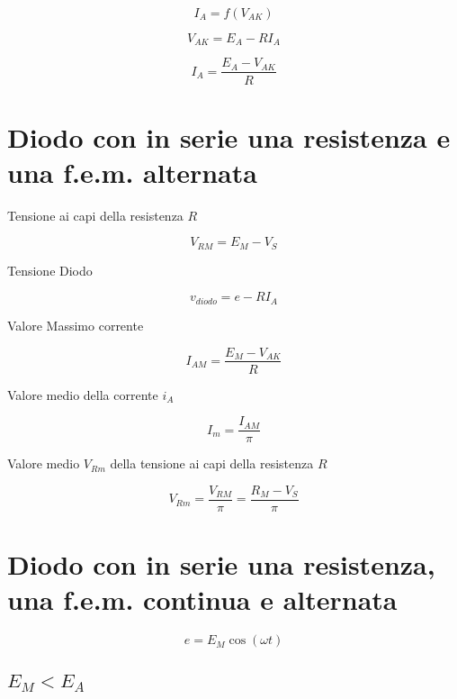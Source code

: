 \begin{equation}
  I_{A} = f(V_{AK})
\end{equation}

\begin{equation}
  V_{AK} = E_{A} - R I_{A}
\end{equation}

\begin{equation}
  I_{A} = \frac{E_{A} - V_{AK}}{R}
\end{equation}

\section{Diodo con in serie una resistenza e una f.e.m. alternata}

Tensione ai capi della resistenza $R$

\begin{equation}
  V_{RM} = E_{M} - V_{S}
\end{equation}

Tensione Diodo

\begin{equation}
  v_{diodo} = e - R I_{A}
\end{equation}

Valore Massimo corrente

\begin{equation}
  I_{AM} = \frac{E_{M} - V_{AK}}{R}
\end{equation}

Valore medio della corrente $i_{A}$

\begin{equation}
  I_{m} = \frac{I_{AM}}{\pi}
\end{equation}

Valore medio $V_{Rm}$ della tensione ai capi della resistenza $R$

\begin{equation}
  V_{Rm} = \frac{V_{RM}}{\pi} = \frac{R_{M} - V_{S}}{\pi}
\end{equation}

\section{Diodo con in serie una resistenza, una f.e.m. continua e alternata}

\begin{equation}
  e = E_{M} \cos(\omega t)
\end{equation}

\subsection{$E_{M} < E_{A}$}

